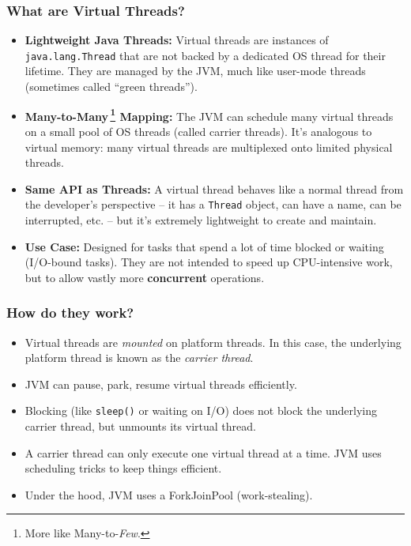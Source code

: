 \documentclass[xcolor={dvipsnames,svgnames},aspectratio=169]{beamer}
\begin{document}
\begin{frame}[fragile, shrink=5]
  \frametitle{ What are Virtual Threads?}

  \begin{itemize}
  \item[\faBook]<1-> \textbf{Lightweight Java Threads:}
    Virtual threads are instances of \texttt{java.lang.Thread} that are
    not backed by a dedicated OS thread for their lifetime. They are managed by
    the JVM, much like user-mode threads (sometimes called ``green threads'').
  \item[\faBook]<1-> \textbf{Many-to-Many\,\footnote{More like
        Many-to-\emph{Few}.} Mapping:}  The JVM can schedule many
    virtual threads on a small pool of OS threads (called carrier threads). It’s
    analogous to virtual memory: many virtual threads are multiplexed onto
    limited physical threads.
  \item[\faBook]<1-> \textbf{Same API as Threads:} A virtual thread behaves like
    a normal thread from the developer's perspective – it has a \texttt{Thread} object,
    can have a name, can be interrupted, etc. – but it’s extremely lightweight
    to create and maintain.
  \item[\faBook]<1-> \textbf{Use Case:} Designed for tasks that spend a lot of
    time blocked or waiting (I/O-bound tasks). They are not intended to speed up
    CPU-intensive work, but to allow vastly more \textbf{concurrent} operations.
  \end{itemize}
\end{frame}

\begin{frame}[fragile]
  \frametitle{How do they work?}

  \begin{itemize}
  \item[\faBook]<1-> Virtual threads are \emph{mounted} on platform threads. In
    this case, the underlying platform thread is known as the \emph{carrier thread}.
  \item[\faBook]<1-> JVM can pause, park, resume virtual threads efficiently.
  \item[\faBook]<1-> Blocking (like \texttt{sleep()} or waiting on I/O) does not
    block the underlying carrier thread, but unmounts its virtual thread.
  \item[\faBook]<1-> A carrier thread can only execute one virtual thread at a
    time. JVM uses scheduling tricks to keep things efficient.
  \item[\faBook]<1-> Under the hood, JVM uses a ForkJoinPool (work-stealing).
  \end{itemize}
\end{frame}
\end{document}
